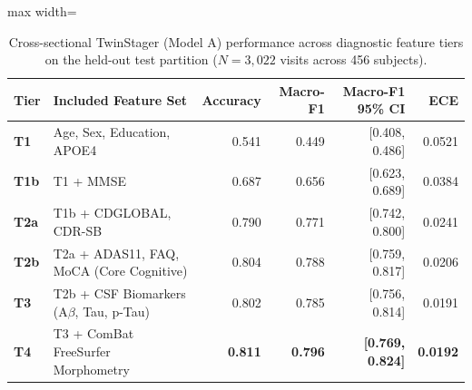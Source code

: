 \begin{table}[t]
\centering
\caption{Cross-sectional TwinStager (Model A) performance across diagnostic feature tiers on the held-out test partition ($N=3,022$ visits across 456 subjects).}
\label{tab:stager_results}
\small
\begin{adjustbox}{max width=\linewidth}
\begin{tabular}{lp{4.8cm}rrrr}
\toprule
\textbf{Tier} & \textbf{Included Feature Set} & \textbf{Accuracy} & \textbf{Macro-F1} & \textbf{Macro-F1 95\% CI} & \textbf{ECE} \\
\midrule
\textbf{T1}  & Age, Sex, Education, APOE4                   & 0.541 & 0.449 & [0.408, 0.486] & 0.0521 \\
\textbf{T1b} & T1 + MMSE                                    & 0.687 & 0.656 & [0.623, 0.689] & 0.0384 \\
\textbf{T2a} & T1b + CDGLOBAL, CDR-SB                       & 0.790 & 0.771 & [0.742, 0.800] & 0.0241 \\
\textbf{T2b} & T2a + ADAS11, FAQ, MoCA (Core Cognitive)     & 0.804 & 0.788 & [0.759, 0.817] & 0.0206 \\
\textbf{T3}  & T2b + CSF Biomarkers ($\text{A}\beta$, Tau, p-Tau) & 0.802 & 0.785 & [0.756, 0.814] & 0.0191 \\
\textbf{T4}  & T3 + ComBat FreeSurfer Morphometry           & \textbf{0.811} & \textbf{0.796} & \textbf{[0.769, 0.824]} & \textbf{0.0192} \\
\bottomrule
\end{tabular}
\end{adjustbox}
\end{table}
